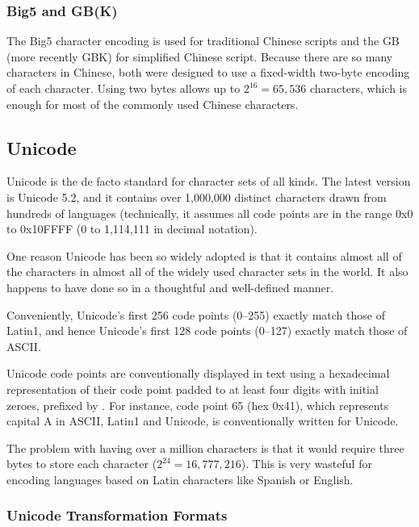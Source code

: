 \subsubsection{Big5 and GB(K)}

The Big5 character encoding is used for traditional Chinese scripts
and the GB (more recently GBK) for simplified Chinese script.  Because
there are so many characters in Chinese, both were designed to use a
fixed-width two-byte encoding of each character.  Using two bytes
allows up to $2^{16} = 65,536$ characters, which is enough for most
of the commonly used Chinese characters.

\subsection{Unicode}\label{section:unicode}

Unicode is the de facto standard for character sets of all kinds.  The
latest version is Unicode 5.2, and it contains over 1,000,000 distinct
characters drawn from hundreds of languages (technically, it assumes
all code points are in the range 0x0 to 0x10FFFF (0 to 1,114,111 in
decimal notation).

One reason Unicode has been so widely adopted is that it contains
almost all of the characters in almost all of the widely used
character sets in the world.  It also happens to have done so in a
thoughtful and well-defined manner.

Conveniently, Unicode's first 256 code points (0--255) exactly match
those of Latin1, and hence Unicode's first 128 code points (0--127)
exactly match those of ASCII.

Unicode code points are conventionally displayed in text using a
hexadecimal representation of their code point padded to at least four
digits with initial zeroes, prefixed by .  For instance, code
point 65 (hex 0x41), which represents capital A in ASCII, Latin1 and
Unicode, is conventionally written  for Unicode.

The problem with having over a million characters is that it would
require three bytes to store each character ($2^{24} = 16,777,216$).
This is very wasteful for encoding languages based on Latin characters
like Spanish or English.

\subsubsection{Unicode Transformation Formats}

